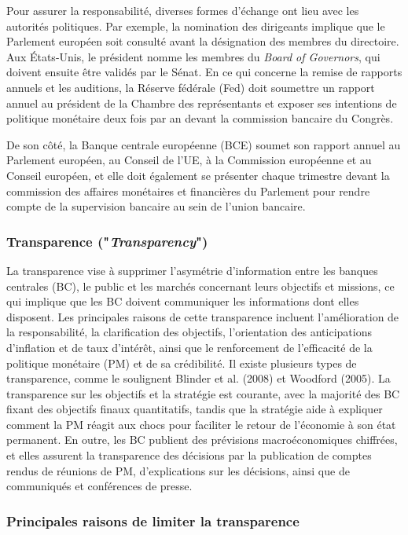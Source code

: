 \documentclass[a4paper, 12pt]{report}
\begin{document}
Pour assurer la responsabilité, diverses formes d'échange ont lieu avec les autorités politiques. Par exemple, la nomination des dirigeants implique que le Parlement européen soit consulté avant la désignation des membres du directoire. Aux États-Unis, le président nomme les membres du \textit{Board of Governors}, qui doivent ensuite être validés par le Sénat. En ce qui concerne la remise de rapports annuels et les auditions, la Réserve fédérale (Fed) doit soumettre un rapport annuel au président de la Chambre des représentants et exposer ses intentions de politique monétaire deux fois par an devant la commission bancaire du Congrès.

 De son côté, la Banque centrale européenne (BCE) soumet son rapport annuel au Parlement européen, au Conseil de l'UE, à la Commission européenne et au Conseil européen, et elle doit également se présenter chaque trimestre devant la commission des affaires monétaires et financières du Parlement pour rendre compte de la supervision bancaire au sein de l'union bancaire.

\subsubsection{Transparence ("\textit{Transparency}")}

La transparence vise à supprimer l'asymétrie d'information entre les banques centrales (BC), le public et les marchés concernant leurs objectifs et missions, ce qui implique que les BC doivent communiquer les informations dont elles disposent. Les principales raisons de cette transparence incluent l'amélioration de la responsabilité, la clarification des objectifs, l'orientation des anticipations d'inflation et de taux d'intérêt, ainsi que le renforcement de l'efficacité de la politique monétaire (PM) et de sa crédibilité. Il existe plusieurs types de transparence, comme le soulignent Blinder et al. (2008) et Woodford (2005). La transparence sur les objectifs et la stratégie est courante, avec la majorité des BC fixant des objectifs finaux quantitatifs, tandis que la stratégie aide à expliquer comment la PM réagit aux chocs pour faciliter le retour de l'économie à son état permanent. En outre, les BC publient des prévisions macroéconomiques chiffrées, et elles assurent la transparence des décisions par la publication de comptes rendus de réunions de PM, d'explications sur les décisions, ainsi que de communiqués et conférences de presse.

\subsubsection{Principales raisons de limiter la transparence} 
\end{document}
